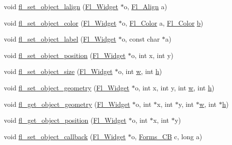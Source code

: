 \begin{DoxyCompactItemize}
\item 
void \hyperlink{forms_8_h_a5fe0dd0e3b61b4c72de5fddfdc939b93}{fl\+\_\+set\+\_\+object\+\_\+lalign} (\hyperlink{class_fl___widget}{Fl\+\_\+\+Widget} $\ast$o, \hyperlink{_enumerations_8_h_a44e8bcd1e030e65e4f88cbae64a7c3e3}{Fl\+\_\+\+Align} a)
\item 
void \hyperlink{forms_8_h_a8fa2f1c3becc0bfdc865493832235212}{fl\+\_\+set\+\_\+object\+\_\+color} (\hyperlink{class_fl___widget}{Fl\+\_\+\+Widget} $\ast$o, \hyperlink{_enumerations_8_h_a8b762953646f8abee866061f1af78a6a}{Fl\+\_\+\+Color} a, \hyperlink{_enumerations_8_h_a8b762953646f8abee866061f1af78a6a}{Fl\+\_\+\+Color} \hyperlink{forms_8_h_a0ba06a290a384fa06b1b90745827dae2}{b})
\item 
void \hyperlink{forms_8_h_abb4f52197361cebdfeeb3b5e894ece2f}{fl\+\_\+set\+\_\+object\+\_\+label} (\hyperlink{class_fl___widget}{Fl\+\_\+\+Widget} $\ast$o, const char $\ast$a)
\item 
void \hyperlink{forms_8_h_a12f68a16577b20f9d71aed953dfdecff}{fl\+\_\+set\+\_\+object\+\_\+position} (\hyperlink{class_fl___widget}{Fl\+\_\+\+Widget} $\ast$o, int x, int y)
\item 
void \hyperlink{forms_8_h_af093ca5ff6cedf2e44dd95272b1a4247}{fl\+\_\+set\+\_\+object\+\_\+size} (\hyperlink{class_fl___widget}{Fl\+\_\+\+Widget} $\ast$o, int \hyperlink{forms_8_h_aac374e320caaadeca4874add33b62af2}{w}, int \hyperlink{forms_8_h_a7e427ba5b307f9068129699250690066}{h})
\item 
void \hyperlink{forms_8_h_a8b9a2998704b4581f6799c83bdad6b3b}{fl\+\_\+set\+\_\+object\+\_\+geometry} (\hyperlink{class_fl___widget}{Fl\+\_\+\+Widget} $\ast$o, int x, int y, int \hyperlink{forms_8_h_aac374e320caaadeca4874add33b62af2}{w}, int \hyperlink{forms_8_h_a7e427ba5b307f9068129699250690066}{h})
\item 
void \hyperlink{forms_8_h_a88e4641d57aef656e9cdf0b9e934339c}{fl\+\_\+get\+\_\+object\+\_\+geometry} (\hyperlink{class_fl___widget}{Fl\+\_\+\+Widget} $\ast$o, int $\ast$x, int $\ast$y, int $\ast$\hyperlink{forms_8_h_aac374e320caaadeca4874add33b62af2}{w}, int $\ast$\hyperlink{forms_8_h_a7e427ba5b307f9068129699250690066}{h})
\item 
void \hyperlink{forms_8_h_a554b7463f3b776c429f82cf581151c9b}{fl\+\_\+get\+\_\+object\+\_\+position} (\hyperlink{class_fl___widget}{Fl\+\_\+\+Widget} $\ast$o, int $\ast$x, int $\ast$y)
\item 
void \hyperlink{forms_8_h_afe5943f032e3cd2c321ffae6137a016a}{fl\+\_\+set\+\_\+object\+\_\+callback} (\hyperlink{class_fl___widget}{Fl\+\_\+\+Widget} $\ast$o, \hyperlink{forms_8_h_a93a9878bd5445be5505c060c990ed9e0}{Forms\+\_\+\+CB} c, long a)

\end{DoxyCompactItemize}
